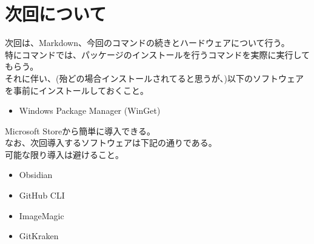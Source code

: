 \documentclass{ltjsarticle}
\begin{document}
\section{次回について}
次回は、Markdown、今回のコマンドの続きとハードウェアについて行う。\\
特にコマンドでは、パッケージのインストールを行うコマンドを実際に実行してもらう。\\
それに伴い、(殆どの場合インストールされてると思うが、)以下のソフトウェアを事前にインストールしておくこと。
\begin{itemize}
    \item Windows Package Manager (WinGet)
\end{itemize}
Microsoft Storeから簡単に導入できる。\\


なお、次回導入するソフトウェアは下記の通りである。\\
可能な限り導入は避けること。
\begin{itemize}
    \item Obsidian
    \item GitHub CLI
    \item ImageMagic
    \item GitKraken
\end{itemize}
\end{document}
